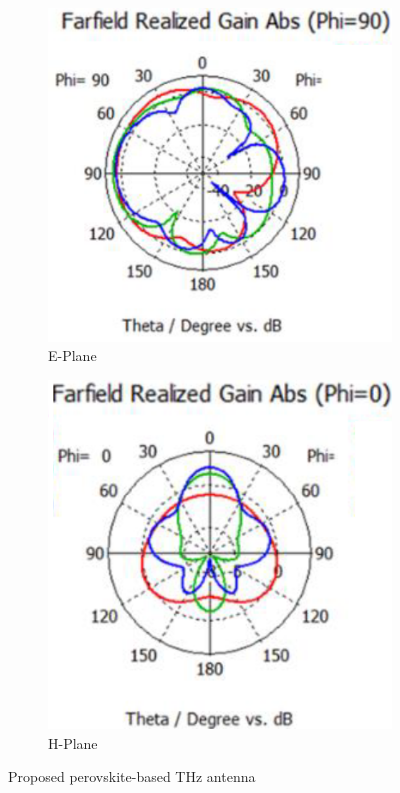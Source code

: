 \documentclass[12pt]{suhbook}
\begin{document}
\begin{figure}[hbt!]
\begin{subfigure}{.45\textwidth}
\centering
\includegraphics[width=0.9\linewidth]{20}
\caption{E-Plane}
\label{fig:sfig15a}
\end{subfigure}%
\begin{subfigure}{.45\textwidth}
  \centering
  \includegraphics[width=0.9\linewidth]{21}
  \caption{H-Plane}
  \label{fig:sfigb15}
\end{subfigure}
\caption{Proposed perovskite-based THz antenna}
\label{fig:fig 15}
\end{figure}
\end{document}

